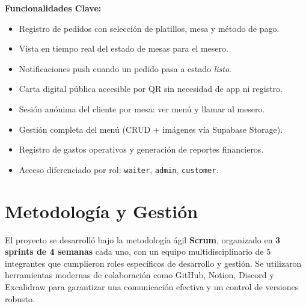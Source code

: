 \textbf{Funcionalidades Clave:}
\begin{itemize}[leftmargin=1.5em]
  \item Registro de pedidos con selección de platillos, mesa y método de pago.
  \item Vista en tiempo real del estado de mesas para el mesero.
  \item Notificaciones push cuando un pedido pasa a estado \textit{listo}.
  \item Carta digital pública accesible por QR sin necesidad de app ni registro.
  \item Sesión anónima del cliente por mesa: ver menú y llamar al mesero.
  \item Gestión completa del menú (CRUD + imágenes vía Supabase Storage).
  \item Registro de gastos operativos y generación de reportes financieros.
  \item Acceso diferenciado por rol: \texttt{waiter}, \texttt{admin}, \texttt{customer}.
\end{itemize}

\section{Metodología y Gestión}

El proyecto se desarrolló bajo la metodología ágil \textbf{Scrum}, organizado en
\textbf{3 sprints de 4 semanas} cada uno, con un equipo multidisciplinario de
5 integrantes que cumplieron roles específicos de desarrollo y gestión. Se utilizaron
herramientas modernas de colaboración como GitHub, Notion, Discord y Excalidraw
para garantizar una comunicación efectiva y un control de versiones robusto.